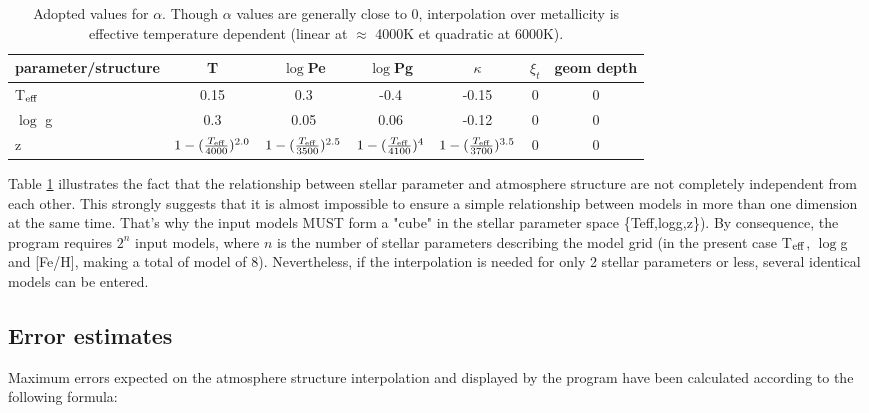 \documentclass[11pt]{article}
\begin{document}
\begin{table}[!h]
\begin{tabular}{l|c|c|c|c|c|c}
parameter/structure                    & T                             & $\log$Pe                          & $\log$Pg     &   $\kappa$                       &  $\xi_{t}$   & geom depth          \\
\hline T$\rm_{eff}$                     &  0.15                         &  0.3                             &   -0.4       &   -0.15                        &   0          &   0              \\ 
$\log$ g                                &   0.3                         &  0.05                            &  0.06        &  -0.12                         &   0          &   0              \\
z                                       &   $1-(\frac{T\rm_{eff}}{4000})^{2.0}$  &  $1-(\frac{T\rm_{eff}}{3500})^{2.5}$      &  $1-(\frac{T\rm_{eff}}{4100})^4$      &  $1-(\frac{T\rm_{eff}}{3700})^{3.5}$      &     0        &     0            \\
\end{tabular}
\caption{Adopted values for $\alpha$. Though $\alpha$ values are generally close to 0, interpolation over metallicity is effective temperature dependent (linear at $\approx$ 4000K et quadratic at 6000K).}\label{tab:interp_power}
\end{table}
Table \ref{tab:interp_power} illustrates the fact that the relationship between stellar parameter and atmosphere structure are not completely independent from each other. This strongly suggests that it is almost impossible to ensure a simple relationship between models in more than one dimension at the same time. That's why the input models MUST form a "cube" in the stellar parameter space \{Teff,logg,z\}). By consequence, the program requires $2^{n}$ input models, where $n$ is the number of stellar parameters describing the model grid (in the present case T$\rm_{eff}$, $\log$g and [Fe/H], making a total of model of 8). Nevertheless, if the interpolation is needed for only 2 stellar parameters or less, several identical models can be entered. 


\subsection{Error estimates}
Maximum errors expected on the atmosphere structure interpolation and displayed by the program have been calculated according to the following formula:
\end{document}
